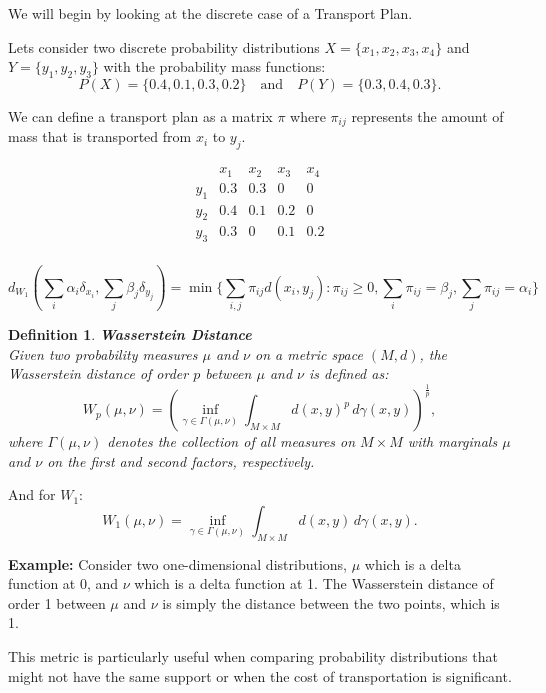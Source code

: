 \documentclass[11pt]{book}
\newtheorem{definition}{Definition}[section]
\begin{document}
We will begin by looking at the discrete case of a Transport Plan. 

Lets consider two discrete probability distributions \( X = \{x_1, x_2, x_3, x_4\} \) and \( Y = \{y_1, y_2, y_3\} \)
with the probability mass functions:
\[
    P(X) = \{0.4, 0.1, 0.3, 0.2\} \quad \text{and} \quad P(Y) = \{0.3, 0.4, 0.3\}.
\]

We can define a transport plan as a matrix \( \pi \) where \( \pi_{ij} \) represents the amount of mass that is transported from \( x_i \) to \( y_j \).


\[
\begin{array}{c|cccc}
  & x_1 & x_2 & x_3 & x_4 \\
\hline
y_1 & 0.3 & 0.3 & 0   & 0   \\
y_2 & 0.4 & 0.1 & 0.2 & 0   \\
y_3 & 0.3 & 0   & 0.1 & 0.2 \\
\end{array}
\]

\[
d_{W_1} \left( \sum_{i} \alpha_i \delta_{x_i}, \sum_{j} \beta_j \delta_{y_j} \right) = 
\min \{ \sum_{i,j} \pi_{ij} d(x_i, y_j) : \pi_{ij} \geq 0, 
\sum_{i} \pi_{ij} = \beta_j, \sum_{j} \pi_{ij} = \alpha_i \}
\]


\begin{definition}{\textbf{Wasserstein Distance}} \\
    Given two probability measures \( \mu \) and \( \nu \) on a metric space \( (M, d) \), the Wasserstein distance of order \( p \) between \( \mu \) and \( \nu \) is defined as:
    \[
    W_p(\mu, \nu) = \left( \inf_{\gamma \in \Gamma(\mu, \nu)} \int_{M \times M} d(x,y)^p \, d\gamma(x,y) \right)^{\frac{1}{p}},
    \]
    where \( \Gamma(\mu, \nu) \) denotes the collection of all measures on \( M \times M \) with marginals \( \mu \) and \( \nu \) on the first and second factors, respectively.
\end{definition}

And for $W_1$:
\[
    W_1(\mu, \nu) = \inf_{\gamma \in \Gamma(\mu, \nu)} \int_{M \times M} d(x,y) \, d\gamma(x,y).
\]


\textbf{Example:} Consider two one-dimensional distributions, \( \mu \) which is a delta function at 0, 
and \( \nu \) which is a delta function at 1. The Wasserstein distance of order 1 between \( \mu \) and \( \nu \) is simply the distance between the two points, which is 1.

This metric is particularly useful when comparing probability distributions that might not have the same support or when the cost of transportation is significant.
\end{document}

